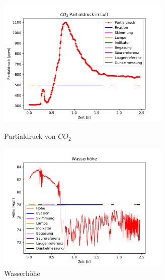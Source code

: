 \documentclass[12pt]{article}
\begin{document}
\begin{figure}[H]
{		\includegraphics[width=82.5mm]{VE-Wasser/Partialdruck}
		\caption{Partialdruck von $CO_2$}
	}
	\centering
	\parbox{82.5mm}{
		\centering
		\includegraphics[width=82.5mm]{VE-Wasser/Wasserhoehe}
		\caption{Wasserh\"ohe }
	}
	\hfill%
	\parbox{82.5mm}{
		\centering
	}
\end{figure}
\end{document}

